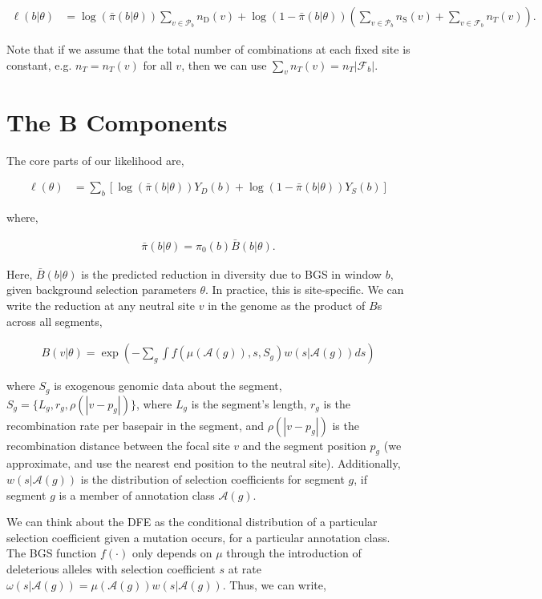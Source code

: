 \documentclass[11pt]{article}
\begin{document}
\begin{align}
  \ell(b | \theta)  &= \log(\bar{\pi}(b | \theta)) \sum_{v \in \mathcal{P}_b} n_\text{D}(v) + \log(1-\bar{\pi}(b | \theta)) \left(\sum_{v \in \mathcal{P}_b} n_\text{S}(v) +  \sum_{v \in \mathcal{F}_b} n_T(v)  \right).
\end{align}

Note that if we assume that the total number of combinations at each fixed site
is constant, e.g. $n_T = n_T(v)$ for all $v$, then we can use $\sum_v n_T(v) =
n_T |\mathcal{F}_b|$.

\section*{The B Components}

The core parts of our likelihood are,

\begin{align}
  \ell(\theta) &=  \sum_b [\log(\bar{\pi}(b | \theta)) Y_D(b) + \log(1-\bar{\pi}(b | \theta)) Y_S(b)]
\end{align}

where,

\begin{align}
  \bar{\pi}(b |\theta) = \pi_0(b) \bar{B}(b | \theta).
\end{align}

Here, $\bar{B}(b | \theta)$ is the predicted reduction in diversity due to BGS
in window $b$, given background selection parameters $\theta$. In practice,
this is site-specific. We can write the reduction at any neutral site $v$ in
the genome as the product of $B$s across all segments, 

\begin{align}
  B(v | \theta) = \exp\left(- \sum_g \int f(\mu(\mathcal{A}(g)), s, S_g) w(s|\mathcal{A}(g)) ds \right)
\end{align}

where $S_g$ is exogenous genomic data about the segment, $S_g = \{L_g, r_g,
\rho(|v-p_g|)\}$, where $L_g$ is the segment's length, $r_g$ is the
recombination rate per basepair in the segment, and $\rho(|v-p_g|)$ is the
recombination distance between the focal site $v$ and the segment position
$p_g$ (we approximate, and use the nearest end position to the neutral site).
Additionally, $w(s|\mathcal{A}(g))$ is the distribution of selection
coefficients for segment $g$, if segment $g$ is a member of annotation class
$\mathcal{A}(g)$.

We can think about the DFE as the conditional distribution of a particular
selection coefficient given a mutation occurs, for a particular annotation
class. The BGS function $f(\cdot)$ only depends on $\mu$ through the
introduction of deleterious alleles with selection coefficient $s$ at rate
$\omega(s|\mathcal{A}(g)) = \mu(\mathcal{A}(g)) w(s | \mathcal{A}(g))$. Thus,
we can write, 
\end{document}
